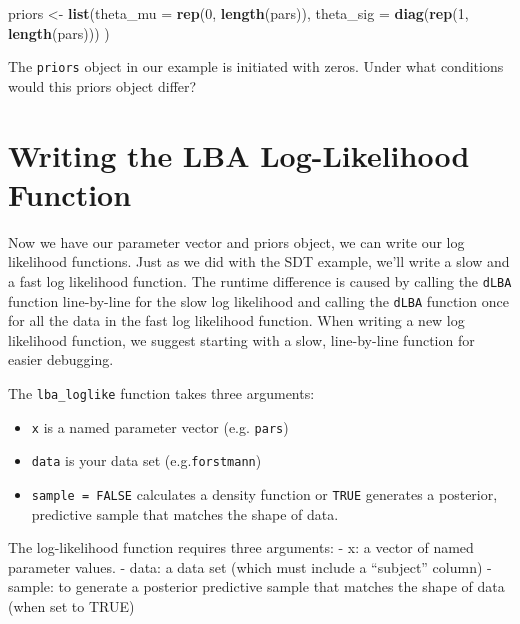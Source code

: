 \documentclass[]{book}
\newenvironment{Shaded}{\begin{snugshade}}{\end{snugshade}}
\newcommand{\DataTypeTok}[1]{\textcolor[rgb]{0.13,0.29,0.53}{#1}}
\newcommand{\DecValTok}[1]{\textcolor[rgb]{0.00,0.00,0.81}{#1}}
\newcommand{\KeywordTok}[1]{\textcolor[rgb]{0.13,0.29,0.53}{\textbf{#1}}}
\newcommand{\NormalTok}[1]{#1}
\newcommand{\StringTok}[1]{\textcolor[rgb]{0.31,0.60,0.02}{#1}}
\providecommand{\tightlist}{%
  \setlength{\itemsep}{0pt}\setlength{\parskip}{0pt}}
\begin{document}
\begin{Shaded}
\begin{Highlighting}[]
\NormalTok{priors <-}\StringTok{ }\KeywordTok{list}\NormalTok{(}\DataTypeTok{theta_mu =} \KeywordTok{rep}\NormalTok{(}\DecValTok{0}\NormalTok{, }\KeywordTok{length}\NormalTok{(pars)),}
  \DataTypeTok{theta_sig =} \KeywordTok{diag}\NormalTok{(}\KeywordTok{rep}\NormalTok{(}\DecValTok{1}\NormalTok{, }\KeywordTok{length}\NormalTok{(pars)))}
\NormalTok{)}
\end{Highlighting}
\end{Shaded}

The \texttt{priors} object in our example is initiated with zeros. Under what conditions would this priors object differ?

\hypertarget{writing-the-lba-log-likelihood-function}{%
\section{Writing the LBA Log-Likelihood Function}\label{writing-the-lba-log-likelihood-function}}

Now we have our parameter vector and priors object, we can write our log likelihood functions. Just as we did with the SDT example, we'll write a slow and a fast log likelihood function. The runtime difference is caused by calling the \texttt{dLBA} function line-by-line for the slow log likelihood and calling the \texttt{dLBA} function once for all the data in the fast log likelihood function. When writing a new log likelihood function, we suggest starting with a slow, line-by-line function for easier debugging.

The \texttt{lba\_loglike} function takes three arguments:

\begin{itemize}
\tightlist
\item
  \texttt{x} is a named parameter vector (e.g. \texttt{pars})
\item
  \texttt{data} is your data set (e.g.\texttt{forstmann})
\item
  \texttt{sample\ =\ FALSE} calculates a density function or \texttt{TRUE} generates a posterior, predictive sample that matches the shape of data.
\end{itemize}

The log-likelihood function requires three arguments:
- x: a vector of named parameter values.
- data: a data set (which must include a ``subject'' column)
- sample: to generate a posterior predictive sample that matches the shape of data (when set to TRUE)
\end{document}
